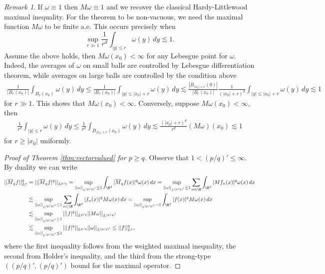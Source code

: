 \documentclass[reqno]{amsart}
\theoremstyle{definition}
\theoremstyle{remark}
\newtheorem*{remark}{Remark}
\begin{document}
\begin{remark}
	If $\omega \equiv 1$ then $M\omega \equiv 1$ and we recover the classical Hardy-Littlewood maximal inequality. For the theorem to be non-vacuous, we need the maximal function $M\omega$ to be finite a.e. This occurs precisely when 
		\[ \sup_{r \gg 1} \frac{1}{r^d} \int_{|y| \leq r} \omega(y) \, dy \lesssim 1. \]
	Assume the above holds, then $M\omega(x_0) < \infty$ for any Lebesgue point for $\omega$. Indeed, the averages of $\omega$ on small balls are controlled by Lebesgue differentiation theorem, while averages on large balls are controlled by the condition above
		\begin{align*}
			\frac{1}{|B_r (x_0)|} \int_{B_r (x_0)} \omega(y) \, dy \leq\frac{1}{|B_r (x_0)|} \int_{|y| \leq |x_0| + r} \omega(y) \, dy \lesssim \frac{|B_{|x_0| + r} (0)|}{|B_r (x_0)|} \frac{1}{(|x_0| + r)^d} \int_{|y| \leq |x_0| + r} \omega(y) \, dy \lesssim 1
		\end{align*}
	for $r \gg 1$. This shows that $M\omega(x_0) < \infty$. Conversely, suppose $M\omega(x_0) < \infty$, then 
	\begin{align*}
		\frac{1}{r^d} \int_{|y| \leq r} \omega(y) \, dy \leq \frac{1}{r^d} \int_{B_{|x_0| + r} (x_0)} \omega(y) \, dy \lesssim \frac{(|x_0| + r)^d}{r^d} (M\omega)(x_0) \lesssim 1
	\end{align*}
	for $r \geq |x_0|$ uniformly. 
\end{remark}

\begin{proof}[Proof of Theorem \ref{thm:vectorvalued} for $p \geq q$]
	Observe that $1 < (p/q)' \leq \infty$. By duality we can write
	\begin{align*}
		||\overline M_q f||_{L^p}^q
			&= || |\overline M_q f|^q ||_{L^{p/q}} = \sup_{||\omega||_{L^{(p/q)'}} \leq 1}\int_{\R^d} |\overline M_q f (x)|^q \omega(x) \, dx =\sup_{||\omega||_{L^{(p/q)'}} \leq 1} \sum_{n \in \N}  \int_{\R^d} |Mf_n (x)|^q \omega(x) \, dx \\
			&\lesssim \sup_{||\omega||_{L^{(p/q)'}} \leq 1} \sum_{n \in \N}  \int_{\R^d} |f_n (x)|^q M \omega(x) \, dx = \sup_{||\omega||_{L^{(p/q)'}} = 1} \int_{\R^d} |f(x)|^q M\omega (x) \, dx \\
			&\lesssim \sup_{||\omega||_{L^{(p/q)'}} \leq 1} || |f|^q||_{L^{p/q}} ||M\omega||_{L^{(p/q)'}} \\
			&\lesssim \sup_{||\omega||_{L^{(p/q)'}} \leq 1} || |f|^q||_{L^{p/q}} ||\omega||_{L^{(p/q)'}} \leq || f||_{L^p}^q,
	\end{align*}
where the first inequality follows from the weighted maximal inequality, the second from Holder's inequality, and the third from the strong-type $((p/q)', (p/q)')$ bound for the maximal operator. 
\end{proof}




\end{document}
